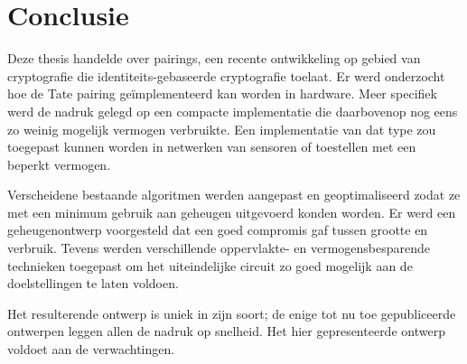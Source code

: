 
\section{Conclusie}

Deze thesis handelde over pairings, een recente ontwikkeling op gebied van cryptografie die identiteits-gebaseerde cryptografie toelaat. Er werd onderzocht hoe de Tate pairing ge\"implementeerd kan worden in hardware. Meer specifiek werd de nadruk gelegd op een compacte implementatie die daarbovenop nog eens zo weinig mogelijk vermogen verbruikte. Een implementatie van dat type zou toegepast kunnen worden in netwerken van sensoren of toestellen met een beperkt vermogen.

Verscheidene bestaande algoritmen werden aangepast en geoptimaliseerd zodat ze met een minimum gebruik aan geheugen uitgevoerd konden worden. Er werd een geheugenontwerp voorgesteld dat een goed compromis gaf tussen grootte en verbruik. Tevens werden verschillende oppervlakte- en vermogensbesparende technieken toegepast om het uiteindelijke circuit zo goed mogelijk aan de doelstellingen te laten voldoen.

Het resulterende ontwerp is uniek in zijn soort; de enige tot nu toe gepubliceerde ontwerpen leggen allen de nadruk op snelheid. Het hier gepresenteerde ontwerp voldoet aan de verwachtingen.
